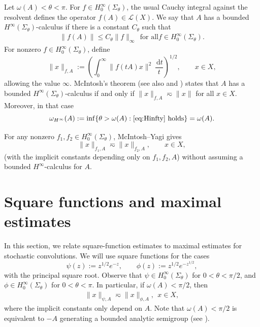 \documentclass[11pt]{amsart}
\theoremstyle{definition}
\theoremstyle{remark}
\numberwithin{equation}{section}
\newcommand{\1}{\mathbf 1}
\newcommand{\norm}[1]{\lVert #1\rVert}
\newcommand{\dd}{\,\mathrm d}
\newcommand{\Sigmaa}[1]{\Sigma_{#1}}
\begin{document}
Let $\omega(A) < \theta < \pi$.
For $f \in H^{\infty}_0(\Sigma_{\theta})$, the usual Cauchy integral against
the resolvent defines the operator $f(A)\in\mathscr{L}(X)$. We say that $A$ has a
bounded $H^\infty(\Sigmaa{\theta})$-calculus if there is a constant $C_{\theta}$ such that  
\begin{align}\label{eq:Hinfty}
\norm{f(A)}\leq C_\theta\norm{f}_\infty \ \ \text{for all
$f\in H_0^\infty(\Sigmaa{\theta})$}. 
\end{align}
For nonzero $f \in H_0^\infty(\Sigmaa{\theta})$, define
\begin{equation}
 \norm{x}_{f,A}
 :=\left(\int_0^\infty\norm{f(tA)x}^2\,\frac{\dd t}{t}\right)^{1/2},
 \qquad x\in X,
 \label{eq:square-function}
\end{equation}
allowing the value $\infty$. McIntosh's theorem
\cite{McIntosh1986} (see also
\cite[Theorem~7.3.1]{Haase2006} and
\cite[Theorem~10.4.21]{HNVW2017}) states that $A$ has a bounded
$H^\infty(\Sigmaa{\theta})$-calculus if and only if
$\norm{x}_{f,A}\eqsim \norm{x}$ for all $x\in X$. Moreover, in that case 
\[\omega_{H^\infty}(A) := \inf\{\theta>\omega(A): \text{\eqref{eq:Hinfty} holds}\} = \omega(A).\]

For any nonzero $f_1, f_2\in
H_0^\infty(\Sigma_{\theta})$, McIntosh--Yagi
\cite[Theorem~5]{McIntoshYagi} gives
\[
 \norm{x}_{f_1,A}\eqsim \norm{x}_{f_2,A},
 \qquad x\in X,
\]
(with the implicit constants depending only on $f_1, f_2, A$) without assuming a bounded $H^\infty$-calculus for $A$.


\section{Square functions and maximal estimates}
\label{sec:squarefunc}


In this section, we relate square-function estimates to maximal estimates
for stochastic convolutions. 
We will use square functions for the cases
\begin{equation}
 \psi(z):=z^{1/2}e^{-z},\qquad
 \phi(z):=z^{1/2}e^{-z^{1/2}},
 \label{eq:defpsiphi}
\end{equation}
with the principal square root. 
Observe that
$\psi\in H_0^\infty(\Sigma_{\theta})$ for $0<\theta<\pi/2$, and
$\phi\in H_0^\infty(\Sigma_{\theta})$ for $0<\theta<\pi$.
In particular, if $\omega(A)<\pi/2$, then 
\begin{align}\label{eq:psiphi}
\norm{x}_{\psi,A}\eqsim \norm{x}_{\phi,A}, \ \ x\in X,
\end{align}
where the implicit constants only depend on $A$. Note that $\omega(A)<\pi/2$ is equivalent to $-A$ generating a bounded analytic semigroup (see \cite[Theorem G.5.2]{HNVW2017}).
\end{document}
